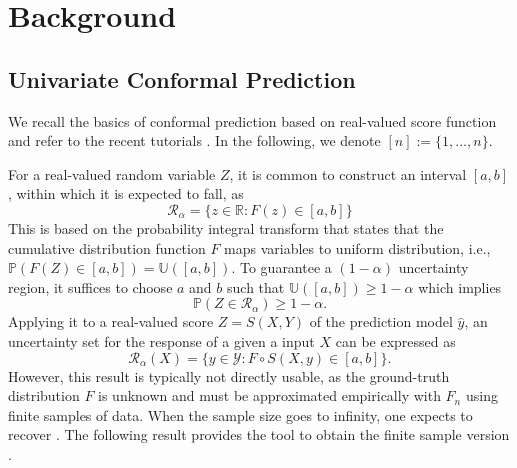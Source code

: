 \section{Background}



\subsection{Univariate Conformal Prediction}
\label{subsec:Univariate_Conformal_Prediction}

We recall the basics of conformal prediction based on real-valued score function and refer to the recent tutorials \citep{Shafer_Vovk08, angelopoulos2021gentle}. In the following, we denote $[n]:=\{1,\dots, n\}$.

For a real-valued random variable $Z$, it is common to construct an interval $[a,b]$, within which it is expected to fall, as
\begin{equation}\label{eq:true_confidence_set}
\mathcal{R}_\alpha = \{z \in \mathbb{R}: F(z) \in [a, b]\}
\end{equation}
This is based on the probability integral transform that states that the cumulative distribution function $F$ maps variables to uniform distribution, i.e., 
$\mathbb{P}(F(Z) \in [a, b]) = \mathbb{U}([a, b]).$
To guarantee a $(1-\alpha)$ uncertainty region, it suffices to choose $a$ and $b$ such that $ \mathbb{U}([a, b]) \geq 1-\alpha$ which implies
\begin{equation}\label{eq:coverage_exact_univariate_quantile_region}
    \mathbb{P}\left(Z \in \mathcal{R}_\alpha\right) \geq 1-\alpha.
\end{equation}
Applying it to a real-valued score $Z = S(X, Y)$ of the prediction model $\hat y$, an uncertainty set for the response of a given a input $X$ can be expressed as
\begin{equation}\label{eq:exact_uq}
\mathcal{R}_\alpha(X) = \big\{y \in \mathcal{Y}: F\circ S(X, y) \in [a, b]\big\}.
\end{equation}
However, this result is typically not directly usable, as the ground-truth distribution $F$ is unknown and must be approximated empirically with $F_n$ using finite samples of data. When the sample size goes to infinity, one expects to recover .
The following result provides the tool to obtain the finite sample version \cite{Shafer_Vovk08}.


